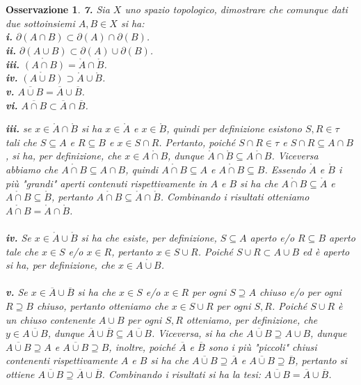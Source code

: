 \documentclass[oneside, 11pt]{amsbook}
\makeatletter
\newcommand{\0}{{(0)}}
\newcommand{\3}{{(3)}}
\theoremstyle{colonplain}
\theoremstyle{colondefinition}
\theoremstyle{colonremark}
\newtheorem{rmk}[thm]{Osservazione}
\numberwithin{equation}{chapter}
\renewcommand{\proofname}{Dimostrazione}
\renewenvironment{proof}[1][\proofname]{\par
  \pushQED{\end{proof}}%
  \normalfont \topsep6\p@\@plus6\p@\relax
  \trivlist
  \item[\hskip\labelsep\bfseries #1:]\ignorespaces
}{%
  \popQED\endtrivlist\@endpefalse
}
\makeatother
\begin{document}
\begin{rmk}
\textbf{7.} Sia $X$ uno spazio topologico, dimostrare che comunque dati due sottoinsiemi $A, B \in X$ si ha: \\
\textbf{i.} $\partial (A \cap B) \subset \partial (A) \cap \partial (B)$. \\
\textbf{ii.} $\partial (A \cup B) \subset \partial (A) \cup \partial (B)$. \\
\textbf{iii.} $\mathring{(A \cap B)} = \mathring{A} \cap \mathring{B}$. \\
\textbf{iv.} $\mathring{(A \cup B)} \supset \mathring{A} \cup \mathring{B}$. \\
\textbf{v.} $\overline{A \cup B} = \overline{A} \cup \overline{B}$. \\
\textbf{vi.} $\overline{A \cap B} \subset \overline{A} \cap \overline{B}$.
\begin{proof}
\textbf{iii.} se $x \in \mathring{A} \cap \mathring{B}$ si ha $x \in \mathring{A}$ e $x \in \mathring{B}$, quindi per definizione esistono $S, R \in \tau$ tali che $S \subseteq A$ e $R \subseteq B$ e $x \in S \cap R$. Pertanto, poiché $S \cap R \in \tau$ e $S \cap R \subseteq A \cap B$, si ha, per definizione, che $x \in \mathring{A \cap B}$, dunque $\mathring{A} \cap \mathring{B} \subseteq \mathring{A \cap B}$. Viceversa abbiamo che $\mathring{A \cap B} \subseteq A \cap B$, quindi $\mathring{A \cap B} \subseteq A$ e $\mathring{A \cap B} \subseteq B$. Essendo $\mathring{A}$ e $\mathring{B}$ i più "grandi" aperti contenuti rispettivamente in $A$ e $B$ si ha che $\mathring{A \cap B} \subseteq \mathring{A}$ e $\mathring{A \cap B} \subseteq \mathring{B}$, pertanto $\mathring{A \cap B} \subseteq \mathring{A} \cap \mathring{B}$. Combinando i risultati otteniamo $\mathring{A \cap B} = \mathring{A} \cap \mathring{B}$. \\ \\
\textbf{iv.} Se $x \in \mathring{A} \cup \mathring{B}$ si ha che esiste, per definizione, $S \subseteq A$ aperto e/o $R \subseteq B$ aperto tale che $x \in S$ e/o $x \in R$, pertanto $x \in S \cup R$. Poiché $S \cup R \subset A \cup B$ ed è aperto si ha, per definizione, che $x \in \mathring{A \cup B}$. \\ \\
\textbf{v.} Se $x \in \overline{A} \cup \overline{B}$ si ha che $x \in S$ e/o $x \in R$ per ogni $S \supseteq A$ chiuso e/o per ogni $R \supseteq B$ chiuso, pertanto otteniamo che $x \in S \cup R$ per ogni $S, R$. Poiché $S \cup R$ è un chiuso contenente $A \cup B$ per ogni $S, R$ otteniamo, per definizione, che $y \in \overline{A \cup B}$, dunque $\overline{A} \cup \overline{B} \subseteq \overline{A \cup B}$. Viceversa, si ha che $\overline{A \cup B} \supseteq A \cup B$, dunque $\overline{A \cup B} \supseteq A$ e $\overline{A \cup B} \supseteq B$, inoltre, poiché $\overline{A}$ e $\overline{B}$ sono i più "piccoli" chiusi contenenti rispettivamente $A$ e $B$ si ha che $\overline{A \cup B} \supseteq \overline{A}$ e $\overline{A \cup B} \supseteq \overline{B}$, pertanto si ottiene $\overline{A \cup B} \supseteq \overline{A} \cup \overline{B}$. Combinando i risultati si ha la tesi: $\overline{A \cup B} = \overline{A} \cup \overline{B}$. \\ \\

\end{proof}
\end{rmk}
\end{document}
